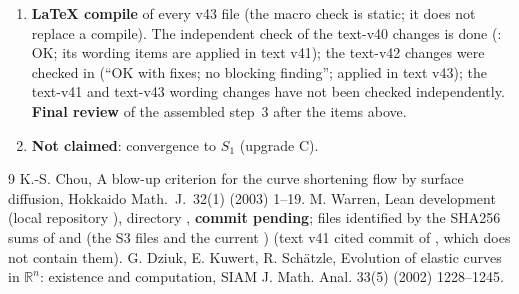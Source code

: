 \documentclass[11pt]{article}
\begin{document}
\begin{enumerate}[leftmargin=*]
\item \textbf{LaTeX compile} of every v43 file (the macro check is static; it does not replace a compile). The independent check of the text-v40 changes is done (: OK; its wording items are applied in text v41); the text-v42 changes were checked in  (``OK with fixes; no blocking finding''; applied in text v43); the text-v41 and text-v43 wording changes have not been checked independently. \textbf{Final review} of the assembled step~3 after the items above.
\item \textbf{Not claimed}: convergence to $S_1$ (upgrade C).
\end{enumerate}

\begin{thebibliography}{9}
 K.-S. Chou, A blow-up criterion for the curve shortening flow by surface diffusion, Hokkaido Math.\ J.\ 32(1) (2003) 1--19.
 M. Warren, Lean development  (local repository ), directory , \textbf{commit pending}; files identified by the SHA256 sums of  and  (the S3 files and the current ) (text v41 cited commit  of , which does not contain them).
 G. Dziuk, E. Kuwert, R. Sch{\"a}tzle, Evolution of elastic curves in $\mathbb R^n$: existence and computation, SIAM J. Math. Anal. 33(5) (2002) 1228--1245.
\end{thebibliography}
\end{document}
